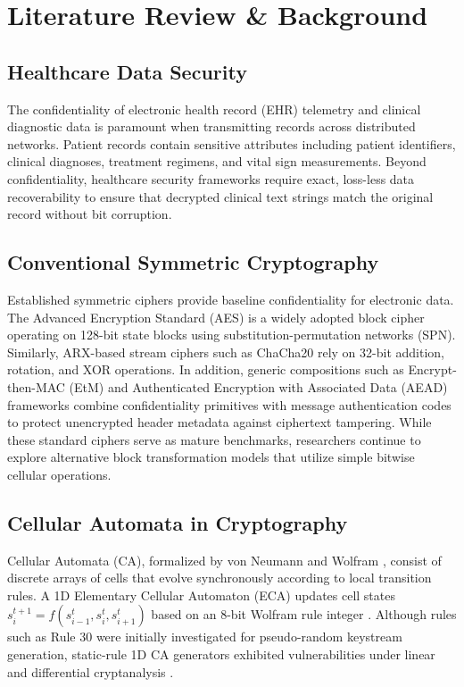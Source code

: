 \section{Literature Review \& Background}
\label{sec:literature_review}

\subsection{Healthcare Data Security}
\label{subsec:healthcare_sec}
The confidentiality of electronic health record (EHR) telemetry and clinical diagnostic data is paramount when transmitting records across distributed networks. Patient records contain sensitive attributes including patient identifiers, clinical diagnoses, treatment regimens, and vital sign measurements. Beyond confidentiality, healthcare security frameworks require exact, loss-less data recoverability to ensure that decrypted clinical text strings match the original record without bit corruption.

\subsection{Conventional Symmetric Cryptography}
\label{subsec:conventional_crypto}
Established symmetric ciphers provide baseline confidentiality for electronic data. The Advanced Encryption Standard (AES) \cite{daemen2002design, dworkin2007recommendation} is a widely adopted block cipher operating on 128-bit state blocks using substitution-permutation networks (SPN). Similarly, ARX-based stream ciphers such as ChaCha20 \cite{bernstein2008chacha, rfc8439} rely on 32-bit addition, rotation, and XOR operations. In addition, generic compositions such as Encrypt-then-MAC (EtM) \cite{bellare2000authenticated} and Authenticated Encryption with Associated Data (AEAD) frameworks \cite{rogaway2002authenticated} combine confidentiality primitives with message authentication codes to protect unencrypted header metadata against ciphertext tampering. While these standard ciphers serve as mature benchmarks, researchers continue to explore alternative block transformation models that utilize simple bitwise cellular operations.

\subsection{Cellular Automata in Cryptography}
\label{subsec:ca_background}
Cellular Automata (CA), formalized by von Neumann and Wolfram \cite{wolfram1983statistical}, consist of discrete arrays of cells that evolve synchronously according to local transition rules. A 1D Elementary Cellular Automaton (ECA) updates cell states $s_i^{t+1} = f(s_{i-1}^t, s_i^t, s_{i+1}^t)$ based on an 8-bit Wolfram rule integer \cite{wolfram1986random}. Although rules such as Rule 30 were initially investigated for pseudo-random keystream generation, static-rule 1D CA generators exhibited vulnerabilities under linear and differential cryptanalysis \cite{gutowitz1993cryptology, nandi2002theory, biham1991differential, matsui1993linear}.

